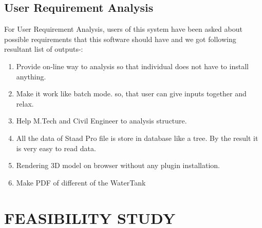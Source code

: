 \documentclass[12pt,includeheadfoot,a4paper]{report}
\begin{document}


\section{User Requirement Analysis}
 For User Requirement Analysis, users of this system have been asked about possible requirements
that this software should have and we got following resultant list of outputs-:
   \begin {enumerate} \item Provide on-line way to analysis so that individual does not have to install anything.
    \item Make it work like batch mode. so, that user can give inputs together and relax.
   \item Help M.Tech and Civil Engineer to analysis structure.
   \item All the data of Staad Pro file is store in database like a tree. By the result it is very easy to
read data.
    \item Rendering 3D model on browser without any plugin installation.
    \item Make PDF of different of the WaterTank
\end {enumerate}


\chapter{FEASIBILITY STUDY}
\end{document}
